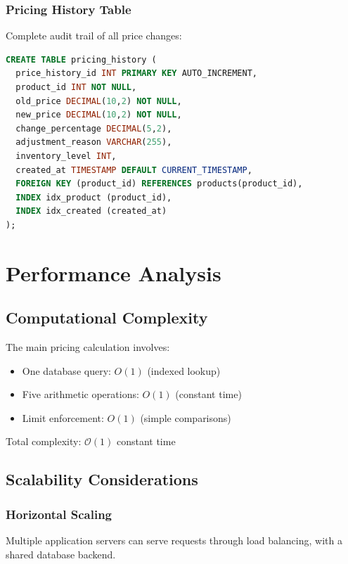 \documentclass[12pt,a4paper,oneside]{report}
\begin{document}
\subsection{Pricing History Table}

Complete audit trail of all price changes:

\begin{lstlisting}[language=SQL, caption=Pricing History Table Schema]
CREATE TABLE pricing_history (
  price_history_id INT PRIMARY KEY AUTO_INCREMENT,
  product_id INT NOT NULL,
  old_price DECIMAL(10,2) NOT NULL,
  new_price DECIMAL(10,2) NOT NULL,
  change_percentage DECIMAL(5,2),
  adjustment_reason VARCHAR(255),
  inventory_level INT,
  created_at TIMESTAMP DEFAULT CURRENT_TIMESTAMP,
  FOREIGN KEY (product_id) REFERENCES products(product_id),
  INDEX idx_product (product_id),
  INDEX idx_created (created_at)
);
\end{lstlisting}

\newpage

\chapter{Performance Analysis}

\section{Computational Complexity}

The main pricing calculation involves:

\begin{itemize}
    \item One database query: $O(1)$ (indexed lookup)
    \item Five arithmetic operations: $O(1)$ (constant time)
    \item Limit enforcement: $O(1)$ (simple comparisons)
\end{itemize}

Total complexity: $\mathcal{O}(1)$ constant time

\section{Scalability Considerations}

\subsection{Horizontal Scaling}

Multiple application servers can serve requests through load balancing, with a shared database backend.
\end{document}

